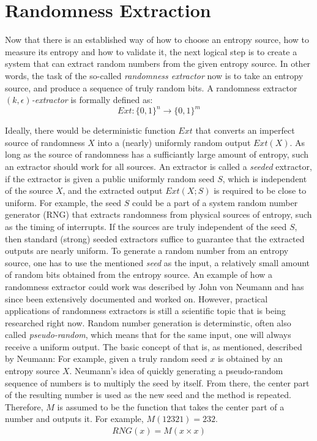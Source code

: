 \section{Randomness Extraction}
Now that there is an established way of how to choose an entropy source, how to measure its entropy and how to validate it, the next logical step is to create a system that can extract random numbers from the given entropy source.
In other words, the task of the so-called \emph{randomness extractor} now is to take an entropy source, and produce a sequence of truly random bits.
\newline
A randomness extractor $(k,\epsilon)$\emph{-extractor} is formally defined as:
\begin{equation}
    Ext: \{0, 1\}^n \to \{0,1\}^m
\end{equation}

\noindent
Ideally, there would be deterministic function $Ext$ that converts an imperfect source of randomness $X$ into a (nearly) uniformly random output $Ext(X)$.
As long as the source of randomness has a sufficiantly large amount of entropy, such an extractor should work for all sources.
\newline
An extractor is called a \emph{seeded} extractor, if the extractor is given a public uniformly random seed $S$, which is independent of the source $X$, and the extracted output $Ext(X; S)$ is required to be close to uniform.
For example, the seed $S$ could be a part of a system random number generator (RNG) that extracts randomness from physical sources of entropy, such as the timing of interrupts.
If the sources are truly independent of the seed $S$, then standard (strong) seeded extractors suffice to guarantee that the extracted outputs are nearly uniform\cite{randomness:extractor3}.
\emptyline
To generate a random number from an entropy source, one has to use the mentioned \emph{seed} as the input, a relatively small amount of random bits obtained from the entropy source.
An example of how a randomness extractor could work was described by John von Neumann  and has since been extensively documented and worked on.
However, practical applications of randomness extractors is still a scientific topic that is being researched right now.
\emptyline 
Random number generation is determinstic, often also called \emph{pseudo-random}, which means that for the same input, one will always receive a uniform output.
The basic concept of that is, as mentioned, described by Neumann\cite{randomness:extractor4}:
\emptyline
For example, given a truly random seed $x$ is obtained by an entropy source $X$.
Neumann's idea of quickly generating a pseudo-random sequence of numbers is to multiply the seed by itself. From there, the center part of the resulting number is used as the new seed and the method is repeated.
\newline
Therefore, $M$ is assumed to be the function that takes the center part of a number and outputs it. For example, $M(12321) = 232$.
$$
\begin{array}{l}
    RNG(x) = M \left(x \times x\right)
\end{array}
$$

